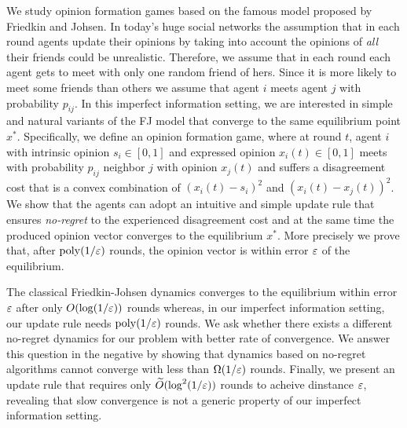 We study opinion formation games based on the famous model proposed by Friedkin
and Johsen.  In today's huge social networks the assumption that in each round
agents update their opinions by taking into account the opinions of
\emph{all} their friends could be unrealistic. Therefore, we assume that
in each round each agent gets to meet with only one random friend of
hers. Since it is more likely to meet some friends than others we assume
that agent $i$ meets agent $j$ with probability $p_{ij}$.
In this imperfect information setting, we are interested in simple and
natural variants of the FJ model that converge to the same equilibrium point $x^*$.
Specifically, we define an opinion formation game, where at round $t$,
agent $i$ with intrinsic opinion $s_i\in[0,1]$ and expressed opinion $x_i(t)
\in[0,1]$ meets with probability $p_{ij}$ neighbor $j$ with opinion $x_j(t)$
and suffers a disagreement cost that is a convex combination of
$(x_i(t) - s_i)^2$ and $(x_i(t) - x_j(t))^2$.
We show that the agents can adopt an intuitive and simple update
rule that ensures \emph{no-regret} to the experienced disagreement cost
and at the same time the produced opinion vector converges
to the equilibrium $x^*$. More precisely we prove that, after
$\mathrm{poly}(1/\varepsilon)$ rounds,
the opinion vector is within error $\varepsilon$  of the equilibrium.

The classical Friedkin-Johsen dynamics converges to the equilibrium within
error $\varepsilon$ after only $O(\log(1/\varepsilon))$ rounds whereas, in our imperfect
information setting, our update rule needs $\mathrm{poly}(1/\varepsilon)$ rounds.
We ask whether there exists a different no-regret dynamics for our problem
with better rate of convergence.  We answer this question in the negative
by showing that dynamics based on no-regret algorithms cannot converge with
less than $\Omega(1/\varepsilon)$ rounds. Finally, we present an update rule that
requires only $\widetilde{O}(\log^2(1/\varepsilon))$ rounds to acheive dinstance
$\varepsilon$, revealing that slow convergence is not a generic property of our
imperfect information setting.
